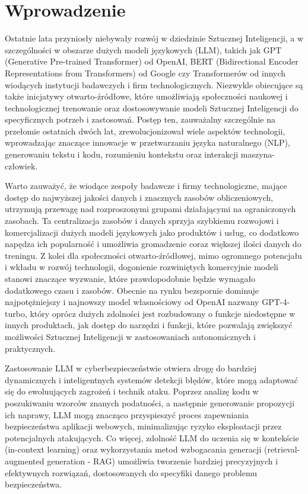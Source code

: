 
\chapter*{Wprowadzenie}

Ostatnie lata przyniosły niebywały rozwój w dziedzinie Sztucznej Inteligencji, a w szczególności w obszarze dużych modeli językowych (LLM), takich jak GPT (Generative Pre-trained Transformer) od OpenAI, BERT (Bidirectional Encoder Representations from Transformers) od Google czy Transformerów od innych wiodących instytucji badawczych i firm technologicznych. Niezwykle obiecujące są także inicjatywy otwarto-źródłowe, które umożliwiają społeczności naukowej i technologicznej trenowanie oraz dostosowywanie modeli Sztucznej Inteligencji do specyficznych potrzeb i zastosowań. Postęp ten, zauważalny szczególnie na przełomie ostatnich dwóch lat, zrewolucjonizował wiele aspektów technologii, wprowadzając znaczące innowacje w przetwarzaniu języka naturalnego (NLP), generowaniu tekstu i kodu, rozumieniu kontekstu oraz interakcji maszyna-człowiek.

Warto zauważyć, że wiodące zespoły badawcze i firmy technologiczne, mające dostęp do najwyższej jakości danych i znacznych zasobów obliczeniowych, utrzymują przewagę nad rozproszonymi grupami działającymi na ograniczonych zasobach. Ta centralizacja zasobów i danych sprzyja szybkiemu rozwojowi i komercjalizacji dużych modeli językowych jako produktów i usług, co dodatkowo napędza ich popularność i umożliwia gromadzenie coraz większej ilości danych do treningu. Z kolei dla społeczności otwarto-źródłowej, mimo ogromnego potencjału i wkładu w rozwój technologii, dogonienie rozwiniętych komercyjnie modeli stanowi znaczące wyzwanie, które prawdopodobnie będzie wymagało dodatkowego czasu i zasobów. Obecnie na rynku bezspornie dominuje najpotężniejszy i najnowszy model własnościowy od OpenAI nazwany GPT-4-turbo, który oprócz dużych zdolności jest rozbudowany o funkcje niedostępne w innych produktach, jak dostęp do narzędzi i funkcji, które pozwalają zwiększyć możliwości Sztucznej Inteligencji w zastosowaniach autonomicznych i praktycznych. 

Zastosowanie LLM w cyberbezpieczeństwie otwiera drogę do bardziej dynamicznych i inteligentnych systemów detekcji błędów, które mogą adaptować się do ewoluujących zagrożeń i technik ataku. Poprzez analizę kodu w poszukiwaniu wzorców znanych podatności, a następnie generowanie propozycji ich naprawy, LLM mogą znacząco przyspieszyć proces zapewniania bezpieczeństwa aplikacji webowych, minimalizując ryzyko eksploatacji przez potencjalnych atakujących. Co więcej, zdolność LLM do uczenia się w kontekście (in-context learning) oraz wykorzystania metod wzbogacania generacji (retrieval-augmented generation - RAG) umożliwia tworzenie bardziej precyzyjnych i efektywnych rozwiązań, dostosowanych do specyfiki danego problemu bezpieczeństwa.

